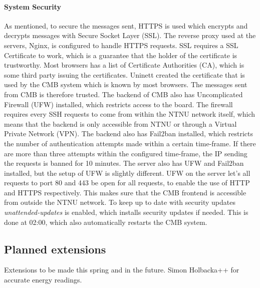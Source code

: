 \paragraph*{System Security}
As mentioned, to secure the messages sent, HTTPS is used which encrypts and decrypts messages with Secure Socket Layer (SSL). The reverse proxy used at the servers, Nginx, is configured to handle HTTPS requests. SSL requires a SSL Certificate to work, which is a guarantee that the holder of the certificate is trustworthy. Most browsers has a list of Certificate Authorities (CA), which is some third party issuing the certificates. Uninett created the certificate that is used by the CMB system which is known by most browsers. The messages sent from CMB is therefore trusted. The backend of CMB also has Uncomplicated Firewall (UFW) \cite{m:ufw} installed, which restricts access to the board. The firewall requires every SSH requests to come from within the NTNU network itself, which means that the backend is only accessible from NTNU or through a Virtual Private Network (VPN). The backend also has Fail2ban  \cite{m:f2b} installed, which restricts the number of authentication attempts made within a certain time-frame. If there are more than three attempts within the configured time-frame, the IP sending the requests is banned for 10 minutes. The server also has UFW and Fail2ban installed, but the setup of UFW is slightly different. UFW on the server let's all requests to port 80 and 443 be open for all requests, to enable the use of HTTP and HTTPS respectively. This makes sure that the CMB frontend is accessible from outside the NTNU network. To keep up to date with security updates \textit{unattended-updates} \cite{m:uau} is enabled, which installs security updates if needed. This is done at 02:00, which also automatically restarts the CMB system.

\subsection{Planned extensions}
Extensions to be made this spring and in the future.
Simon Holbacka++ for accurate energy readings.
